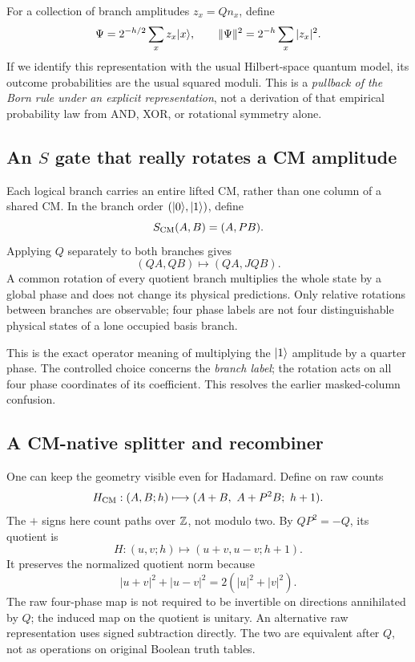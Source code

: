 For a collection of branch amplitudes $z_x=Qn_x$, define
\begin{equation}\label{eq:stateC4}
 \Psi=2^{-h/2}\sum_x z_x\lvert x\rangle,\qquad
 \|\Psi\|^2=2^{-h}\sum_x|z_x|^2.
\end{equation}
If we identify this representation with the usual Hilbert-space quantum model, its outcome probabilities are the usual squared moduli. This is a \emph{pullback of the Born rule under an explicit representation}, not a derivation of that empirical probability law from AND, XOR, or rotational symmetry alone.

\subsection{An \texorpdfstring{$S$}{S} gate that really rotates a CM amplitude}
Each logical branch carries an entire lifted CM, rather than one column of a shared CM. In the branch order $(\lvert 0\rangle,\lvert 1\rangle)$, define
\begin{equation}
 S_{\rm CM}(A,B)=(A,PB).
\end{equation}
Applying $Q$ separately to both branches gives
\begin{equation}
 (QA,QB)\longmapsto(QA,JQB).
\end{equation}
A common rotation of every quotient branch multiplies the whole state by a global phase and does not change its physical predictions. Only relative rotations between branches are observable; four phase labels are not four distinguishable physical states of a lone occupied basis branch.

This is the exact operator meaning of multiplying the $\lvert 1\rangle$ amplitude by a quarter phase. The controlled choice concerns the \emph{branch label}; the rotation acts on all four phase coordinates of its coefficient. This resolves the earlier masked-column confusion.

\subsection{A CM-native splitter and recombiner}
One can keep the geometry visible even for Hadamard. Define on raw counts
\begin{equation}\label{eq:CMH}
 H_{\rm CM}:(A,B;h)\longmapsto(A+B,\ A+P^2B;\ h+1).
\end{equation}
The $+$ signs here count paths over $\mathbb Z$, not modulo two. By $QP^2=-Q$, its quotient is
\begin{equation}
 H:(u,v;h)\longmapsto(u+v,u-v;h+1).
\end{equation}
It preserves the normalized quotient norm because
\begin{equation}
 |u+v|^2+|u-v|^2=2(|u|^2+|v|^2).
\end{equation}
The raw four-phase map is not required to be invertible on directions annihilated by $Q$; the induced map on the quotient is unitary. An alternative raw representation uses signed subtraction directly. The two are equivalent after $Q$, not as operations on original Boolean truth tables.

